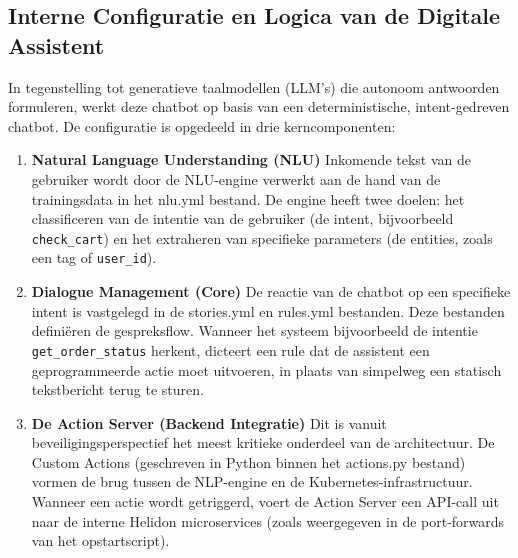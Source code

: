 \subsection{Interne Configuratie en Logica van de Digitale Assistent}
\label{sec:interne_configuratie_en_logica}

In tegenstelling tot generatieve taalmodellen (LLM's) die autonoom antwoorden formuleren, werkt deze chatbot op basis van een deterministische, intent-gedreven chatbot. De configuratie is opgedeeld in drie kerncomponenten:\\

\begin{enumerate}
    \item \textbf{Natural Language Understanding (NLU)} Inkomende tekst van de gebruiker wordt door de NLU-engine verwerkt aan de hand van de trainingsdata in het nlu.yml bestand. De engine heeft twee doelen: het classificeren van de intentie van de gebruiker (de intent, bijvoorbeeld \texttt{check\_cart}) en het extraheren van specifieke parameters (de entities, zoals een tag of \texttt{user\_id}).
    \item \textbf{Dialogue Management (Core)} De reactie van de chatbot op een specifieke intent is vastgelegd in de stories.yml en rules.yml bestanden. Deze bestanden definiëren de gespreksflow. Wanneer het systeem bijvoorbeeld de intentie \texttt{get\_order\_status} herkent, dicteert een rule dat de assistent een geprogrammeerde actie moet uitvoeren, in plaats van simpelweg een statisch tekstbericht terug te sturen.
    \item \textbf{De Action Server (Backend Integratie)} Dit is vanuit beveiligingsperspectief het meest kritieke onderdeel van de architectuur. De Custom Actions (geschreven in Python binnen het actions.py bestand) vormen de brug tussen de NLP-engine en de Kubernetes-infrastructuur. Wanneer een actie wordt getriggerd, voert de Action Server een API-call uit naar de interne Helidon microservices (zoals weergegeven in de port-forwards van het opstartscript).
\end{enumerate}

